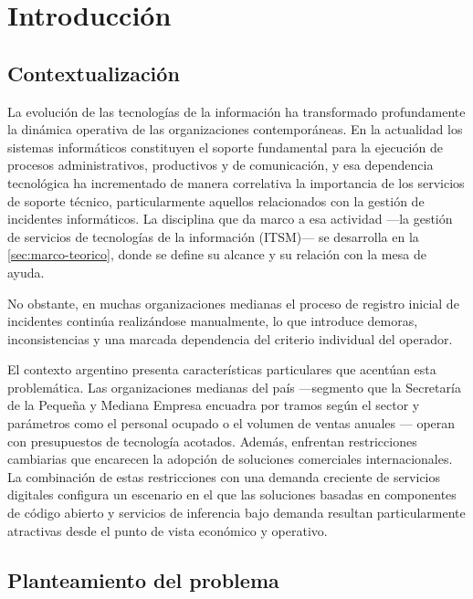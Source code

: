 \section{Introducción}\label{sec:introduccion}

\subsection{Contextualización}\label{subsec:contextualizacion}

La evolución de las tecnologías de la información ha transformado profundamente la dinámica operativa de las organizaciones contemporáneas. En la actualidad los sistemas informáticos constituyen el soporte fundamental para la ejecución de procesos administrativos, productivos y de comunicación, y esa dependencia tecnológica ha incrementado de manera correlativa la importancia de los servicios de soporte técnico, particularmente aquellos relacionados con la gestión de incidentes informáticos. La disciplina que da marco a esa actividad ---la gestión de servicios de tecnologías de la información (ITSM)--- se desarrolla en la \autoref{sec:marco-teorico}, donde se define su alcance y su relación con la mesa de ayuda.

No obstante, en muchas organizaciones medianas el proceso de registro inicial de incidentes continúa realizándose manualmente, lo que introduce demoras, inconsistencias y una marcada dependencia del criterio individual del operador.

El contexto argentino presenta características particulares que acentúan esta problemática. Las organizaciones medianas del país ---segmento que la Secretaría de la Pequeña y Mediana Empresa encuadra por tramos según el sector y parámetros como el personal ocupado o el volumen de ventas anuales \parencite{SEPyME2026_mipyme}--- operan con presupuestos de tecnología acotados. Además, enfrentan restricciones cambiarias que encarecen la adopción de soluciones comerciales internacionales. La combinación de estas restricciones con una demanda creciente de servicios digitales configura un escenario en el que las soluciones basadas en componentes de código abierto y servicios de inferencia bajo demanda resultan particularmente atractivas desde el punto de vista económico y operativo.

\subsection{Planteamiento del problema}\label{subsec:planteamiento-problema}

